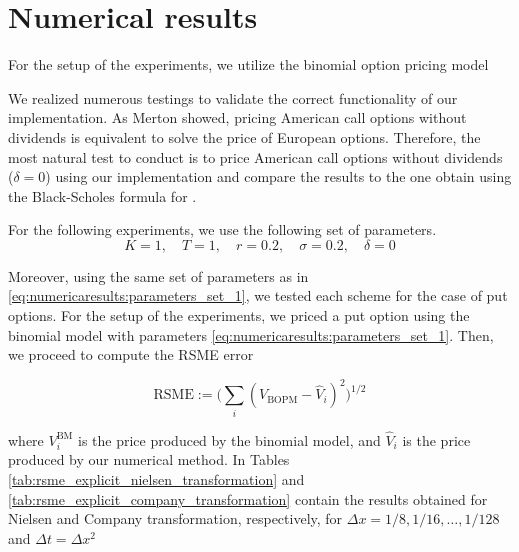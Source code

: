 \section{Numerical results}


For the setup of the experiments, we utilize the binomial option pricing model \cite{cox_1979}

We realized numerous testings to validate the correct functionality of our implementation. As Merton \cite{merton_1973} showed, pricing American call options without dividends is equivalent to solve the price of European options. Therefore, the most natural test to conduct is to price American call options without dividends ($\delta=0$) using our implementation and compare the results to the one obtain using the Black-Scholes formula for  \cite{merton_1973}. 

For the following experiments, we use the following set of parameters.
\begin{equation}
    \label{eq:numericaresults:parameters_set_1}
    K = 1, \quad T = 1, \quad r=0.2, \quad \sigma=0.2, \quad \delta = 0 
\end{equation}

Moreover, using the same set of parameters as in \eqref{eq:numericaresults:parameters_set_1}, we tested each scheme for the case of put options. For the setup of the experiments, we priced a put option using the binomial model \cite{cox_1979} with parameters \eqref{eq:numericaresults:parameters_set_1}. Then, we proceed to compute the RSME error 

\begin{equation}
    \label{eq:numericaresults:rsme}
    \text{RSME} := \bigg(\sum_{i}{(V_{\text{BOPM}} - \hat{V}_i)^2}\bigg)^{1/2}
\end{equation}

where $V^{\text{BM}}_i$ is the price produced by the binomial model, and $\hat{V}_i$ is the price produced by our numerical method. In Tables \ref{tab:rsme_explicit_nielsen_transformation} and \ref{tab:rsme_explicit_company_transformation} contain the results obtained for Nielsen and Company transformation, respectively, for $\Delta{x}=1/8, 1/16,\dots,1/128$ and $\Delta{t}=\Delta{x}^2$

